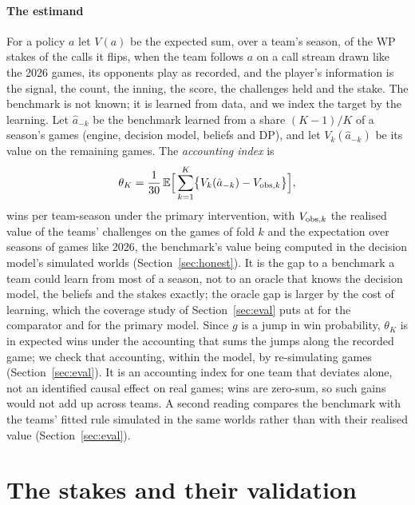 \documentclass[aoas]{imsart}
\theoremstyle{plain}
\theoremstyle{definition}
\newcommand{\E}{\mathbb{E}}
\begin{document}
\paragraph{The estimand} For a policy $a$ let $V(a)$ be the expected sum, over a team's season, of the WP stakes
of the calls it flips, when the team follows $a$ on a call stream drawn like the 2026 games, its opponents play as
recorded, and the player's information is the signal, the count, the inning, the score, the challenges held and the
stake. The benchmark is not known; it is learned from data, and we index the target by the learning. Let $\hat a_{-k}$
be the benchmark learned from a share $(K-1)/K$ of a season's games (engine, decision model, beliefs and DP), and let $V_k(\hat a_{-k})$ be its value on the remaining games. The \emph{accounting index} is
\begin{equation}\label{eq:index}
\theta_K=\frac{1}{30}\,\E\Bigl[\,\sum_{k=1}^K\bigl\{V_k(\hat a_{-k})-V_{{\rm obs},k}\bigr\}\Bigr],
\end{equation}
wins per team-season under the primary intervention, with $V_{{\rm obs},k}$ the realised value of the teams'
challenges on the games of fold $k$ and the expectation over seasons of games like 2026, the benchmark's value being computed in the decision model's
simulated worlds (Section~\ref{sec:honest}). It is the gap to a benchmark a
team could learn from most of a season, not to an oracle that knows the decision model, the beliefs and the stakes
exactly; the oracle gap is larger by the cost of learning, which the coverage study of Section~\ref{sec:eval} puts at
\CPMainLearn{} for the comparator and \CPPrimLearn{} for the primary model. Since $g$ is a
jump in win probability, $\theta_K$ is in expected wins under the accounting that sums the jumps along the recorded
game; we check that accounting, within the model, by re-simulating games (Section~\ref{sec:eval}). It is an accounting
index for one team that deviates alone, not an identified causal effect on real games; wins are zero-sum, so such gains would not add up across teams. A second reading compares the benchmark with the
teams' fitted rule simulated in the same worlds rather than with their realised value (Section~\ref{sec:eval}).

\section{The stakes and their validation}\label{sec:stakes}
\end{document}
